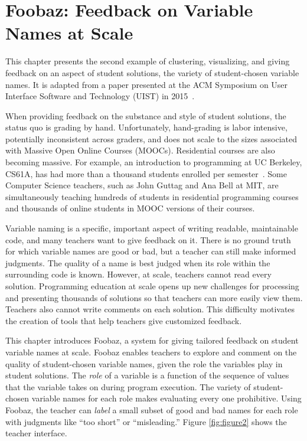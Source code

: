\chapter{Foobaz: Feedback on Variable Names at Scale}\label{chapter:foobaz}

This chapter presents the second example of clustering, visualizing, and giving feedback on an aspect of student solutions, the variety of student-chosen variable names. It is adapted from a paper presented at the ACM Symposium on User Interface Software and Technology (UIST) in 2015~\cite{foobaz}.

When providing feedback on the substance and style of student solutions, the status quo is grading by hand. Unfortunately, hand-grading is labor intensive, potentially inconsistent across graders, and does not scale to the sizes associated with Massive Open Online Courses (MOOCs). Residential courses are also becoming massive. For example, an introduction to programming at UC Berkeley, CS61A, has had more than a thousand students enrolled per semester~\cite{biggestClass}. Some Computer Science teachers, such as John Guttag and Ana Bell at MIT, are simultaneously teaching hundreds of students in residential programming courses and thousands of online students in MOOC versions of their courses.

Variable naming is a specific, important aspect of writing readable, maintainable code, and many teachers want to give feedback on it. There is no ground truth for which variable names are good or bad, but a teacher can still make informed judgments. The quality of a name is best judged when its role within the surrounding code is known. However, at scale, teachers cannot read every solution. Programming education at scale opens up new challenges for processing and presenting thousands of solutions so that teachers can more easily view them. Teachers also cannot write comments on each solution. This difficulty motivates the creation of tools that help teachers give customized feedback.

This chapter introduces Foobaz, a system for giving tailored feedback on student variable names at scale. Foobaz enables teachers to explore and comment on the quality of student-chosen variable names, given the role the variables play in student solutions. The {\it role} of a variable is a function of the sequence of values that the variable takes on during program execution. The variety of student-chosen variable names for each role makes evaluating every one prohibitive. Using Foobaz, the teacher can {\it label} a small subset of good and bad names for each role with judgments like ``too short'' or ``misleading.'' Figure \ref{fig:figure2} shows the teacher interface.


